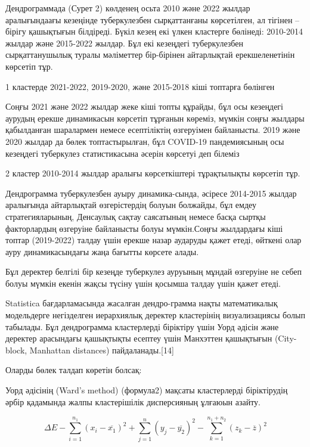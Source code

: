 \begin{multicols}{2}

Дендрограммада (Сурет 2) көлденең осьта 2010 және 2022 жылдар
аралығындаағы кезеңінде туберкулезбен сырқаттанғаны көрсетілген, ал
тігінен -- бірігу қашықтығын білдіреді. Бүкіл кезең екі үлкен кластерге
бөлінеді: 2010-2014 жылдар және 2015-2022 жылдар. Бұл екі кезеңдегі
туберкулезбен сырқаттанушылық туралы мәліметтер бір-бірінен айтарлықтай
ерекшеленетінін көрсетіп тұр.

1 кластерде 2021-2022, 2019-2020, және 2015-2018 кіші топтарға бөлінген

Соңғы 2021 және 2022 жылдар жеке кіші топты құрайды, бұл осы кезеңдегі
аурудың ерекше динамикасын көрсетіп тұрғанын көреміз, мүмкін соңғы
жылдары қабылданған шаралармен немесе есептіліктің өзгеруімен
байланысты. 2019 және 2020 жылдар да бөлек топтастырылған, бұл COVID-19
пандемиясының осы кезеңдегі туберкулез статистикасына әсерін көрсетуі
деп білеміз

2 кластер 2010-2014 жылдар аралығы көрсеткіштері тұрақтылықты көрсетіп
тұр.

Дендрограмма туберкулезбен ауыру динамика-сында, әсіресе 2014-2015 жылдар
аралығында айтарлықтай өзгерістердің болуын болжайды, бұл емдеу
стратегияларының, Денсаулық сақтау саясатының немесе басқа сыртқы
факторлардың өзгеруіне байланысты болуы мүмкін.Соңғы жылдардағы кіші
топтар (2019-2022) талдау үшін ерекше назар аударуды қажет етеді,
өйткені олар ауру динамикасындағы жаңа бағытты көрсете алады.

Бұл деректер белгілі бір кезеңде туберкулез ауруының мұндай өзгеруіне не
себеп болуы мүмкін екенін жақсы түсіну үшін қосымша талдау үшін қажет
етеді.

Statistica бағдарламасында жасалған дендро-грамма нақты математикалық
модельдерге негізделген иерархиялық деректер кластерінің визуализациясы
болып табылады. Бұл дендрограмма кластерлерді біріктіру үшін Уорд әдісін
және деректер арасындағы қашықтықты есептеу үшін Манхэттен қашықтығын
(City-block, Manhattan distances) пайдаланады.{[}14{]}

Оларды бөлек талдап көретін болсақ:

Уорд әдісінің (Ward's method) (формула2) мақсаты кластерлерді
біріктірудің әрбір қадамында жалпы кластерішілік дисперсияның ұлғаюын
азайту.
\end{multicols}

\begin{equation}
  \Delta E - \sum_{i=1}^{n_1} (x_i - \overline{x_1})^2 + \sum_{j=1}^n (y_j - \overline{y_2})^2 - \sum_{k=1}^{n_1 +n_2} (z_k - \overline{z})^2
\end{equation}

